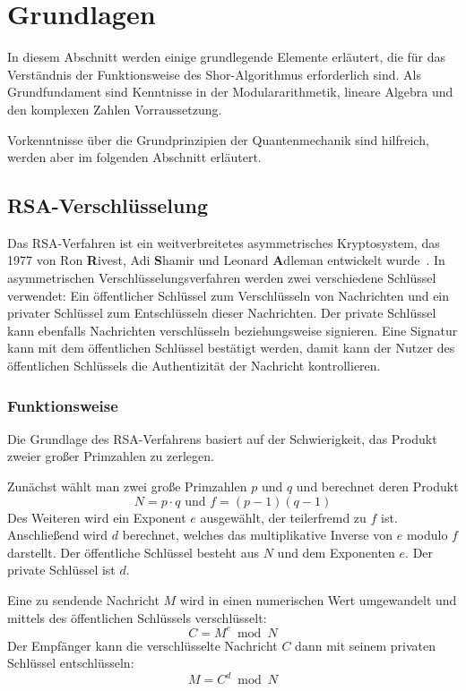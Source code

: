 \section{Grundlagen}
In diesem Abschnitt werden einige grundlegende Elemente erläutert, 
die für das Verständnis der Funktionsweise des Shor-Algorithmus erforderlich sind.
Als Grundfundament sind Kenntnisse in der Modulararithmetik, lineare Algebra und den komplexen Zahlen Vorraussetzung. 

Vorkenntnisse über die Grundprinzipien der Quantenmechanik sind hilfreich, 
werden aber im folgenden Abschnitt erläutert. 


\subsection{RSA-Verschlüsselung}
Das RSA-Verfahren ist ein weitverbreitetes asymmetrisches Kryptosystem, 
das 1977 von Ron \textbf{R}ivest, Adi \textbf{S}hamir und Leonard \textbf{A}dleman entwickelt wurde~\cite{10.1145/359340.359342}. 
In asymmetrischen Verschlüsselungsverfahren werden zwei verschiedene Schlüssel verwendet: 
Ein öffentlicher Schlüssel zum Verschlüsseln von Nachrichten und ein privater Schlüssel zum Entschlüsseln dieser Nachrichten.
Der private Schlüssel kann ebenfalls Nachrichten verschlüsseln beziehungsweise signieren.
Eine Signatur kann mit dem öffentlichen Schlüssel bestätigt werden, 
damit kann der Nutzer des öffentlichen Schlüssels die Authentizität der Nachricht kontrollieren.

\subsubsection*{Funktionsweise}
Die Grundlage des RSA-Verfahrens basiert auf der Schwierigkeit, 
das Produkt zweier großer Primzahlen zu zerlegen. 

Zunächst wählt man zwei große Primzahlen \(p\) und \(q\) und 
berechnet deren Produkt 
\[N = p \cdot q \text{ und } f=(p-1)(q-1)\]  
Des Weiteren wird ein Exponent \(e\) ausgewählt, 
der teilerfremd zu \(f\) ist.
Anschließend wird \(d\) berechnet, 
welches das multiplikative Inverse von \(e\) modulo \(f\) darstellt.
Der öffentliche Schlüssel besteht aus \(N\) und dem Exponenten \(e\). 
Der private Schlüssel ist \(d\).

Eine zu sendende Nachricht \( M \) wird in einen numerischen Wert umgewandelt und mittels des öffentlichen Schlüssels verschlüsselt:
\[
  C = M^e \bmod N
\]
Der Empfänger kann die verschlüsselte Nachricht \(C\) dann mit seinem privaten Schlüssel entschlüsseln:
\[
  M = C^d \bmod N
\]

